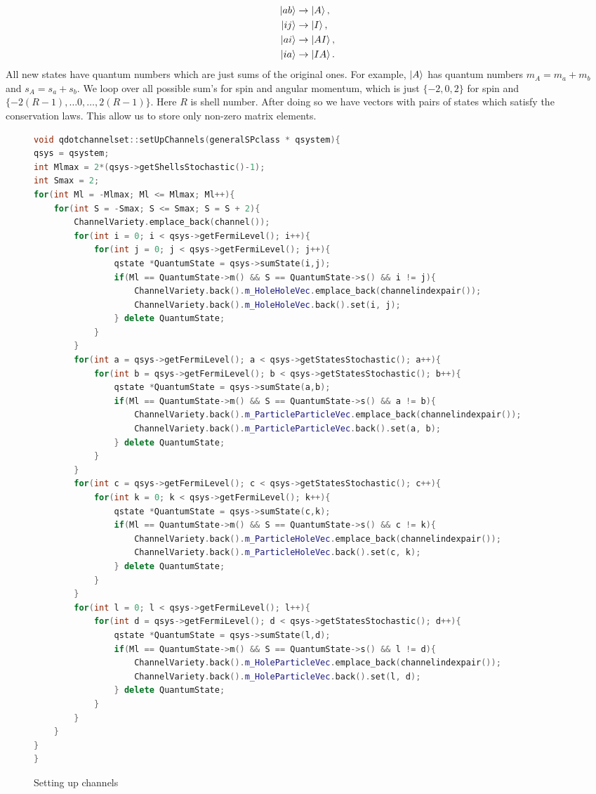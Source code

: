 \documentclass[twoside,english]{uiofysmaster}
\theoremstyle{definition}
\begin{document}
\begin{align}
\ket{ab} &\rightarrow \ket{A}, \\
\ket{ij} &\rightarrow \ket{I}, \\
\ket{ai} &\rightarrow \ket{AI}, \\
\ket{ia} &\rightarrow \ket{IA}. \\
\end{align}
All new states have quantum numbers which are just sums of the original ones. For example, $\ket{A}$ has quantum numbers $m_A = m_a+m_b$ and  $s_A = s_a+s_b$. We loop over all possible sum's for spin and angular momentum, which is just $\{-2,0,2\}$ for spin and $\{-2(R-1), \dots 0, \dots , 2(R-1)\}$. Here $R$ is shell number. After doing so we have vectors with pairs of states which satisfy the conservation laws. This allow us to store only non-zero matrix elements.\\

\begin{figure}
\begin{lstlisting}[language=C++]
void qdotchannelset::setUpChannels(generalSPclass * qsystem){
qsys = qsystem;
int Mlmax = 2*(qsys->getShellsStochastic()-1);
int Smax = 2;
for(int Ml = -Mlmax; Ml <= Mlmax; Ml++){
	for(int S = -Smax; S <= Smax; S = S + 2){
		ChannelVariety.emplace_back(channel());
		for(int i = 0; i < qsys->getFermiLevel(); i++){
			for(int j = 0; j < qsys->getFermiLevel(); j++){
				qstate *QuantumState = qsys->sumState(i,j);
				if(Ml == QuantumState->m() && S == QuantumState->s() && i != j){
					ChannelVariety.back().m_HoleHoleVec.emplace_back(channelindexpair());
					ChannelVariety.back().m_HoleHoleVec.back().set(i, j);
				} delete QuantumState;
			}
		}
		for(int a = qsys->getFermiLevel(); a < qsys->getStatesStochastic(); a++){
			for(int b = qsys->getFermiLevel(); b < qsys->getStatesStochastic(); b++){
				qstate *QuantumState = qsys->sumState(a,b);
				if(Ml == QuantumState->m() && S == QuantumState->s() && a != b){
					ChannelVariety.back().m_ParticleParticleVec.emplace_back(channelindexpair());
					ChannelVariety.back().m_ParticleParticleVec.back().set(a, b);
				} delete QuantumState;
			}
		}
		for(int c = qsys->getFermiLevel(); c < qsys->getStatesStochastic(); c++){
			for(int k = 0; k < qsys->getFermiLevel(); k++){
				qstate *QuantumState = qsys->sumState(c,k);
				if(Ml == QuantumState->m() && S == QuantumState->s() && c != k){
					ChannelVariety.back().m_ParticleHoleVec.emplace_back(channelindexpair());
					ChannelVariety.back().m_ParticleHoleVec.back().set(c, k);
				} delete QuantumState;
			}
		}
		for(int l = 0; l < qsys->getFermiLevel(); l++){			
			for(int d = qsys->getFermiLevel(); d < qsys->getStatesStochastic(); d++){
				qstate *QuantumState = qsys->sumState(l,d);
				if(Ml == QuantumState->m() && S == QuantumState->s() && l != d){
					ChannelVariety.back().m_HoleParticleVec.emplace_back(channelindexpair());
					ChannelVariety.back().m_HoleParticleVec.back().set(l, d);
				} delete QuantumState;
			}
		}
	}
}
}

\end{lstlisting}
\caption{Setting up channels} \label{f:vectors_for_channels}
\end{figure}
\end{document}
